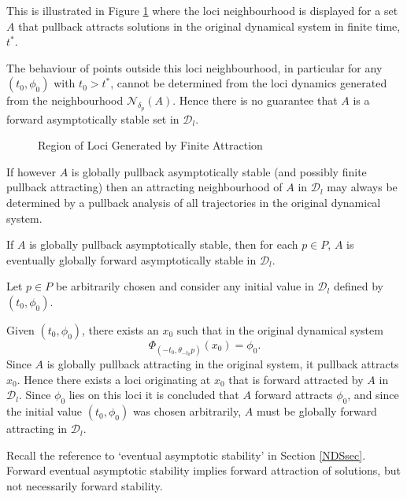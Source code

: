 This is illustrated in Figure \ref{loci2} where the loci
neighbourhood is displayed for a set $A$ that pullback attracts solutions in the
original dynamical system in finite time, $t^*$.

The behaviour of points outside this loci neighbourhood, in
particular for any $(t_0, \phi_0)$ with $t_0 > t^*$, cannot be
determined from the loci dynamics generated from the neighbourhood
$\mathcal{N}_{\delta_p}(A)$. Hence there is no guarantee that $A$
is a forward asymptotically stable set in $\mathcal{D}_l$.

\begin{figure}[htb]
\begin{center}
 \caption{Region of Loci Generated by Finite
Attraction} \protect\label{loci2}
\end{center}
\end{figure}

If however $A$ is globally pullback asymptotically stable (and possibly finite
pullback attracting) then an attracting neighbourhood of $A$ in $\mathcal{D}_l$
may always be determined by a pullback analysis of all trajectories in the
original dynamical system.

\begin{lemma}
\label{lempastoefas}
If $A$ is globally pullback asymptotically stable, then  for each $p \in P$, $A$
is eventually globally forward asymptotically stable in $\mathcal{D}_l$.
\end{lemma}
\begin{prf}
Let $p \in P$ be arbitrarily chosen and consider any initial value in
$\mathcal{D}_l$ defined by $(t_0, \phi_0)$.

Given $(t_0, \phi_0)$, there exists an $x_0$ such that in the original dynamical
system
\[ \Phi_{(-t_0, \theta_{-t_0}p)}(x_0) = \phi_0. \]
Since $A$ is globally pullback attracting in the original system, it pullback
attracts $x_0$. Hence there exists a loci originating at
$x_0$ that is forward attracted by $A$ in $\mathcal{D}_l$. Since $\phi_0$
lies on this loci it is concluded that $A$ forward attracts $\phi_0$, and
since the initial value $(t_0, \phi_0)$ was chosen arbitrarily, $A$ must be
globally forward attracting in $\mathcal{D}_l$.
\end{prf}

Recall the reference to `eventual asymptotic stability' in Section
\ref{NDSsec}. Forward eventual asymptotic stability implies
forward attraction of solutions, but not necessarily forward stability.

